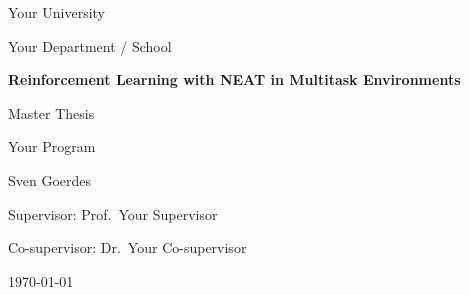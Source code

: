 \documentclass[12pt]{article}
\newcommand{\ThesisTitle}{Reinforcement Learning with NEAT in Multitask Environments}
\newcommand{\ThesisAuthor}{Sven Goerdes}
\newcommand{\ThesisDegree}{Master Thesis}
\newcommand{\ThesisProgram}{Your Program}
\newcommand{\ThesisUniversity}{Your University}
\newcommand{\ThesisDepartment}{Your Department / School}
\newcommand{\ThesisSupervisor}{Supervisor: Prof.\ Your Supervisor}
\newcommand{\ThesisCoSupervisor}{Co-supervisor: Dr.\ Your Co-supervisor}
\newcommand{\ThesisDate}{\today}
\begin{document}
\begin{titlepage}
  \thispagestyle{empty}
  \centering

  {\Large \ThesisUniversity\par}
  {\large \ThesisDepartment\par}
  \vfill

  {\LARGE\bfseries \ThesisTitle\par}
  \vspace{1.5cm}

  {\large \ThesisDegree\par}
  {\large \ThesisProgram\par}
  \vfill

  {\large \ThesisAuthor\par}
  \vspace{0.5cm}
  {\large \ThesisSupervisor\par}
  {\large \ThesisCoSupervisor\par}
  \vfill

  {\large \ThesisDate\par}
\end{titlepage}
\end{document}
